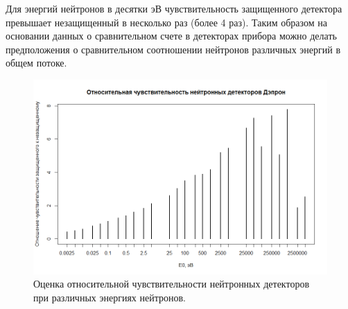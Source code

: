 Для энергий нейтронов в десятки эВ чувствительность защищенного детектора превышает незащищенный в несколько раз (более 4 раз). Таким образом на основании данных о сравнительном счете в детекторах прибора можно делать предположения о сравнительном соотношении нейтронов различных энергий в общем потоке.
\begin{figure}
	\centering
	\includegraphics[width=0.6\linewidth]{images/neutrons/otnsensetiv}
	\caption{Оценка относительной чувствительности нейтронных детекторов при различных энергиях нейтронов.}
	\label{fig:otnsensetiv}
\end{figure}




